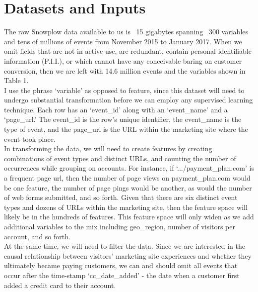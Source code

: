 \documentclass{article} %
\begin{document}
\section{Datasets and Inputs}
\indent\indent The raw Snowplow data available to us is ~15 gigabytes spanning ~300 variables and tens of millions of events from November 2015 to January 2017. When we omit fields that are not in active use, are redundant, contain personal identifiable information (P.I.I.), or which cannot have any conceivable baring on customer conversion, then we are left with 14.6 million events and the variables shown in Table 1.\\
\indent I use the phrase `variable' as opposed to feature, since this dataset will need to undergo substantial transformation before we can employ any supervised learning technique. Each row has an `event\_id' along with an `event\_name' and a `page\_url.' The event\_id is the row's unique identifier, the event\_name is the type of event, and the page\_url is the URL within the marketing site where the event took place. \\
\indent In transforming the data, we will need to create features by creating combinations of event types and distinct URLs, and counting the number of occurrences while grouping on accounts. For instance, if `.../payment\_plan.com' is a frequent page url, then the number of page views on payment\_plan.com would be one feature, the number of page pings would be another, as would the number of web forms submitted, and so forth. Given that there are six distinct event types and dozens of URLs within the marketing site, then the feature space will likely be in the hundreds of features. This feature space will only widen as we add additional variables to the mix including geo\_region, number of visitors per account, and so forth.\\
\indent At the same time, we will need to filter the data. Since we are interested in the causal relationship between visitors' marketing site experiences and whether they ultimately became paying customers, we can and should omit all events that occur after the time-stamp `cc\_date\_added' - the date when a customer first added a credit card to their account.
\end{document}
